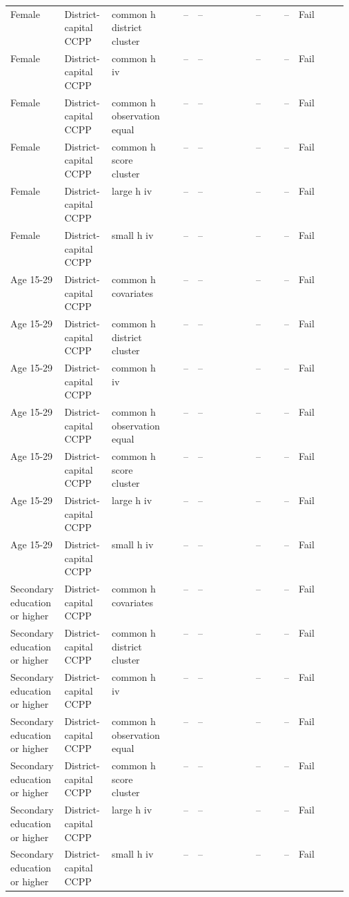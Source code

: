 \begin{longtable}{@{}p{0.16\linewidth}p{0.14\linewidth}p{0.14\linewidth}rp{0.13\linewidth}rrl@{}}
Female & District-capital CCPP & common h district cluster & -- & -- & -- & -- & Fail \\
Female & District-capital CCPP & common h iv & -- & -- & -- & -- & Fail \\
Female & District-capital CCPP & common h observation equal & -- & -- & -- & -- & Fail \\
Female & District-capital CCPP & common h score cluster & -- & -- & -- & -- & Fail \\
Female & District-capital CCPP & large h iv & -- & -- & -- & -- & Fail \\
Female & District-capital CCPP & small h iv & -- & -- & -- & -- & Fail \\
Age 15-29 & District-capital CCPP & common h covariates & -- & -- & -- & -- & Fail \\
Age 15-29 & District-capital CCPP & common h district cluster & -- & -- & -- & -- & Fail \\
Age 15-29 & District-capital CCPP & common h iv & -- & -- & -- & -- & Fail \\
Age 15-29 & District-capital CCPP & common h observation equal & -- & -- & -- & -- & Fail \\
Age 15-29 & District-capital CCPP & common h score cluster & -- & -- & -- & -- & Fail \\
Age 15-29 & District-capital CCPP & large h iv & -- & -- & -- & -- & Fail \\
Age 15-29 & District-capital CCPP & small h iv & -- & -- & -- & -- & Fail \\
Secondary education or higher & District-capital CCPP & common h covariates & -- & -- & -- & -- & Fail \\
Secondary education or higher & District-capital CCPP & common h district cluster & -- & -- & -- & -- & Fail \\
Secondary education or higher & District-capital CCPP & common h iv & -- & -- & -- & -- & Fail \\
Secondary education or higher & District-capital CCPP & common h observation equal & -- & -- & -- & -- & Fail \\
Secondary education or higher & District-capital CCPP & common h score cluster & -- & -- & -- & -- & Fail \\
Secondary education or higher & District-capital CCPP & large h iv & -- & -- & -- & -- & Fail \\
Secondary education or higher & District-capital CCPP & small h iv & -- & -- & -- & -- & Fail \\

\end{longtable}
